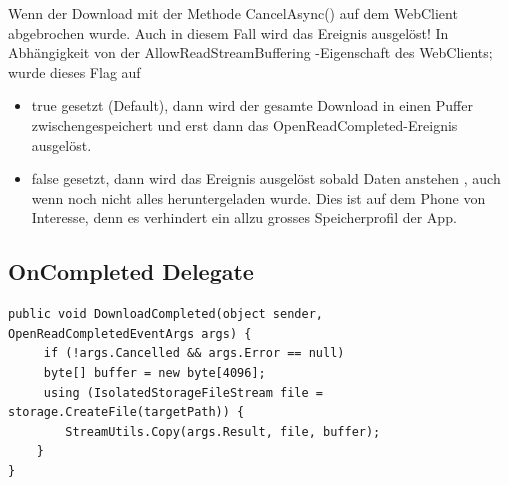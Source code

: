 \documentclass[a4paper,10pt]{scrreprt}
\begin{document}
\begin{framed}
 Wenn der Download mit der Methode CancelAsync() auf dem WebClient abgebrochen wurde. Auch in
diesem Fall wird das Ereignis ausgelöst!
In Abhängigkeit von der AllowReadStreamBuffering -Eigenschaft des WebClients; wurde dieses Flag auf
\begin{itemize}


 \item  true gesetzt (Default), dann wird der gesamte Download in einen Puffer zwischengespeichert
und erst dann das OpenReadCompleted-Ereignis ausgelöst.
 \item  false gesetzt, dann wird das Ereignis ausgelöst sobald Daten anstehen , auch wenn noch nicht
alles heruntergeladen wurde. Dies ist auf dem Phone von Interesse, denn es verhindert ein allzu
grosses Speicherprofil der App.

\end{itemize}
\end{framed}

\subsection{OnCompleted Delegate}
\begin{lstlisting}[caption=OnCompleted Webclient (Stream Copy)]
public void DownloadCompleted(object sender, OpenReadCompletedEventArgs args) {	
	 if (!args.Cancelled && args.Error == null)	
	 byte[] buffer = new byte[4096]; 
	 using (IsolatedStorageFileStream file = storage.CreateFile(targetPath)) {
		StreamUtils.Copy(args.Result, file, buffer);
  	}
}
\end{lstlisting}
\end{document}
